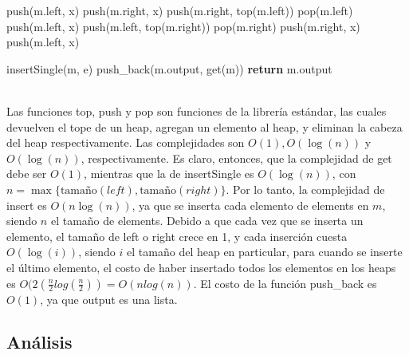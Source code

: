 \documentclass{article}
\theoremstyle{definition}
\theoremstyle{remark}
\begin{document}
\begin{algorithmic}
    \State push(m.left, x)
        \State push(m.right, x)
    \Else
        \State push(m.right, top(m.left))
        \State pop(m.left)
        \State push(m.left, x)
    \EndIf
\Else
        \State push(m.left, top(m.right))
        \State pop(m.right)
        \State push(m.right, x)
    \Else
        \State push(m.left, x)
    \EndIf
\EndIf
\EndProcedure \\
\end{algorithmic}

\begin{algorithmic}
 
    \State insertSingle(m, e) 
    \State push\_back(m.output, get(m)) 
\EndFor
\State \textbf{return} m.output
\EndProcedure \\ \\
\end{algorithmic}

Las funciones top, push y pop son funciones de la librería estándar, las cuales devuelven el tope de un heap, agregan un elemento al heap, y eliminan la cabeza del heap respectivamente. Las complejidades son $O(1), O(\log(n))$ y $O(\log(n))$, respectivamente. Es claro, entonces, que la complejidad de get debe ser $O(1)$, mientras que la de insertSingle es $O(\log(n))$, con $n = \max\{\text{tamaño}(left), \text{tamaño}(right)\}$. Por lo tanto, la complejidad de insert es $O(n \log(n))$, ya que se inserta cada elemento de elements en $m$, siendo $n$ el tamaño de elements. Debido a que cada vez que se inserta un elemento, el tamaño de left o right crece en 1, y cada inserción cuesta $O(\log(i))$, siendo $i$ el tamaño del heap en particular, para cuando se inserte el último elemento, el costo de haber insertado todos los elementos en los heaps es $O(2(\frac{n}{2} log(\frac{n}{2})) = O(nlog(n))$. El costo de la función push\_back es $O(1)$, ya que output es una lista.

\subsection{Análisis}
\end{document}
